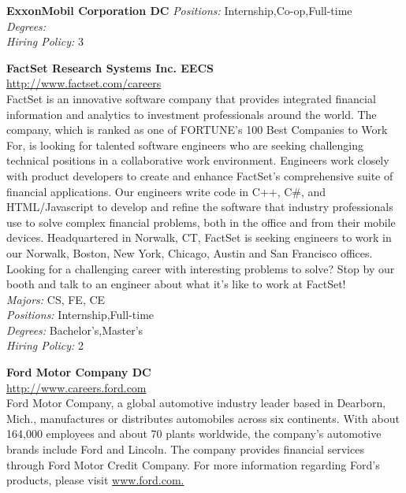 \documentclass[twoside]{article}
\begin{document}
\begin{center}
\begin{multicols}{2}
\begin{minipage}{.95\columnwidth}{\Large\bf ExxonMobil Corporation \hfill DC}
    \emph{Positions:} Internship,Co-op,Full-time\\
    \emph{Degrees:} \\
    \emph{Hiring Policy:} 3\\
\end{minipage}
 \begin{minipage}{.95\columnwidth}{\Large\bf FactSet Research Systems Inc. \hfill EECS}\\
    \url{http://www.factset.com/careers}\\
    FactSet is an innovative software company that provides integrated financial information and analytics to investment professionals around the world. The company, which is ranked as one of FORTUNE’s 100 Best Companies to Work For, is looking for talented software engineers who are seeking challenging technical positions in a collaborative work environment. Engineers work closely with product developers to create and enhance FactSet's comprehensive suite of financial applications. Our engineers write code in C++, C\#, and HTML/Javascript to develop and refine the software that industry professionals use to solve complex financial problems, both in the office and from their mobile devices. Headquartered in Norwalk, CT, FactSet is seeking engineers to work in our Norwalk, Boston, New York, Chicago, Austin and San Francisco offices. Looking for a challenging career with interesting problems to solve? Stop by our booth and talk to an engineer about what it’s like to work at FactSet!\\
    \emph{Majors:} CS, FE, CE\\
    \emph{Positions:} Internship,Full-time\\
    \emph{Degrees:} Bachelor's,Master's\\
    \emph{Hiring Policy:} 2\\
\end{minipage}
 \begin{minipage}{.95\columnwidth}{\Large\bf Ford Motor Company \hfill DC}\\
    \url{http://www.careers.ford.com}\\
    Ford Motor Company, a global automotive industry leader based in Dearborn, Mich., manufactures or distributes automobiles across six continents. With about 164,000 employees and about 70 plants worldwide, the company's automotive brands include Ford and Lincoln. The company provides financial services through Ford Motor Credit Company. For more information regarding Ford's products, please visit \url{www.ford.com.}\\

\end{minipage}
\end{multicols}
\end{center}
\end{document}
